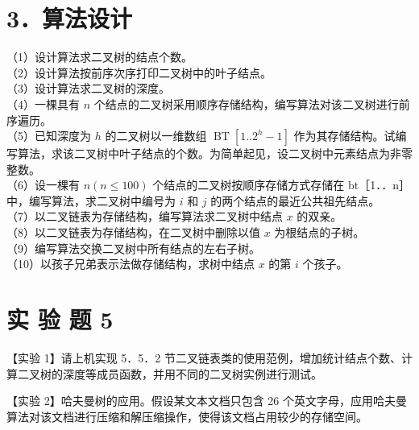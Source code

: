 \documentclass[10pt]{article}
\begin{document}
\section*{3．算法设计}
（1）设计算法求二叉树的结点个数。\\
（2）设计算法按前序次序打印二叉树中的叶子结点。\\
（3）设计算法求二叉树的深度。\\
（4）一棵具有 $n$ 个结点的二叉树采用顺序存储结构，编写算法对该二叉树进行前序遍历。\\
（5）已知深度为 $h$ 的二叉树以一维数组 $\operatorname{BT}\left[1 . .2^{h}-1\right]$ 作为其存储结构。试编写算法，求该二叉树中叶子结点的个数。为简单起见，设二叉树中元素结点为非零整数。\\
（6）设一棵有 $n(n \leqslant 100)$ 个结点的二叉树按顺序存储方式存储在 bt［1．．n］中，编写算法，求二叉树中编号为 $i$ 和 $j$ 的两个结点的最近公共祖先结点。\\
（7）以二叉链表为存储结构，编写算法求二叉树中结点 $x$ 的双亲。\\
（8）以二叉链表为存储结构，在二叉树中删除以值 $x$ 为根结点的子树。\\
（9）编写算法交换二叉树中所有结点的左右子树。\\
（10）以孩子兄弟表示法做存储结构，求树中结点 $x$ 的第 $i$ 个孩子。

\section*{实 验 题 5}
【实验 1】请上机实现 5．5．2 节二叉链表类的使用范例，增加统计结点个数、计算二叉树的深度等成员函数，并用不同的二叉树实例进行测试。

【实验 2】哈夫曼树的应用。假设某文本文档只包含 26 个英文字母，应用哈夫曼算法对该文档进行压缩和解压缩操作，使得该文档占用较少的存储空间。
\end{document}

